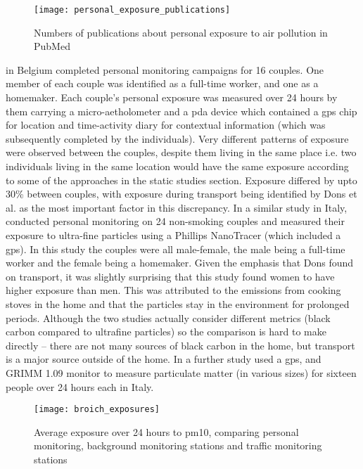 \begin{figure}[H]
\centering
\texttt{[image: personal\_exposure\_publications]}
\caption{Numbers of publications about personal exposure to air pollution in PubMed}
\label{fig:personal_exposure_publications}
\end{figure}

\cite{Dons2011} in Belgium completed personal monitoring campaigns for 16 couples. One member of each couple was identified as a full-time worker, and one as a homemaker. Each couple's personal exposure was measured over 24 hours by them carrying a micro-aetholometer and a \gls{pda} device which contained a \gls{gps} chip for location and time-activity diary for contextual information (which was subsequently completed by the individuals). Very different patterns of exposure were observed between the couples, despite them living in the same place i.e. two individuals living in the same location would have the same exposure according to some of the approaches in the static studies section. Exposure differed by upto 30\% between couples, with exposure during transport being identified by Dons et al. as the most important factor in this discrepancy. In a similar study in Italy, \cite{Buonanno2014} conducted personal monitoring on 24 non-smoking couples and measured their exposure to ultra-fine particles using a Phillips NanoTracer (which included a \gls{gps}). In this study the couples were all male-female, the male being a full-time worker and the female being a homemaker. Given the emphasis that Dons found on transport, it was slightly surprising that this study found women to have higher exposure than men. This was attributed to the emissions from cooking stoves in the home and that the particles stay in the environment for prolonged periods. Although the two studies actually consider different metrics (black carbon compared to ultrafine particles) so the comparison is hard to make directly -- there are not many sources of black carbon in the home, but transport is a major source outside of the home. In a further study \cite{Broich2011} used a \gls{gps}, and GRIMM 1.09 monitor to measure particulate matter (in various sizes) for sixteen people over 24 hours each in Italy.

\begin{figure}[H]
\centering
\texttt{[image: broich\_exposures]}
\caption{Average exposure over 24 hours to \gls{pm10}, comparing personal monitoring, background monitoring stations and traffic monitoring stations}
\label{fig:broich_exposures}
\end{figure}

